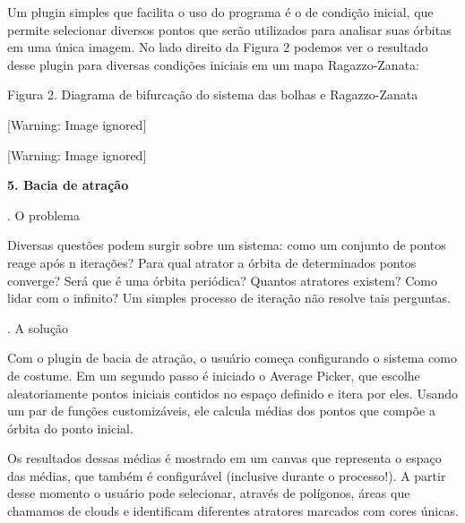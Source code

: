 \documentclass[12pt,twoside]{article}
\begin{document}
{
 Um plugin simples que facilita o uso do programa \'e o de
condi\c{c}\~ao inicial, que permite selecionar diversos pontos que
ser\~ao utilizados para analisar suas \'orbitas em uma \'unica imagem.
No lado direito da Figura 2 podemos ver o resultado desse plugin para
diversas condi\c{c}\~oes iniciais em um mapa Ragazzo{}-Zanata:}

{\centering{}\mdseries
Figura 2. Diagrama de bifurca\c{c}\~ao do sistema das bolhas e
Ragazzo{}-Zanata
\par}

\begin{center}
 [Warning: Image ignored] %

\end{center}
\begin{center}
 [Warning: Image ignored] %

\end{center}
{\bfseries
5. Bacia de atra\c{c}\~ao}

{. O problema}

{
Diversas quest\~oes podem surgir sobre um sistema: como um conjunto de
pontos reage ap\'os n itera\c{c}\~oes? Para qual atrator a \'orbita de
determinados pontos converge? Ser\'a que \'e uma \'orbita peri\'odica?
Quantos atratores existem? Como lidar com o infinito? Um simples
processo de itera\c{c}\~ao n\~ao resolve tais perguntas.}

{. A solu\c{c}\~ao}

{
 Com o plugin de bacia de atra\c{c}\~ao, o usu\'ario come\c{c}a
configurando o sistema como de costume. Em um segundo passo \'e
iniciado o Average Picker, que escolhe aleatoriamente pontos iniciais
contidos no espa\c{c}o definido e itera por eles. Usando um par de
fun\c{c}\~oes customiz\'aveis, ele calcula m\'edias dos pontos que
comp\~oe a \'orbita do ponto inicial.}

{
 Os resultados dessas m\'edias \'e mostrado em um canvas que representa
o espa\c{c}o das m\'edias, que tamb\'em \'e configur\'avel (inclusive
durante o processo!). A partir desse momento o usu\'ario pode
selecionar, atrav\'es de pol\'igonos, \'areas que chamamos de clouds e
identificam diferentes atratores marcados com cores \'unicas.}
\end{document}
